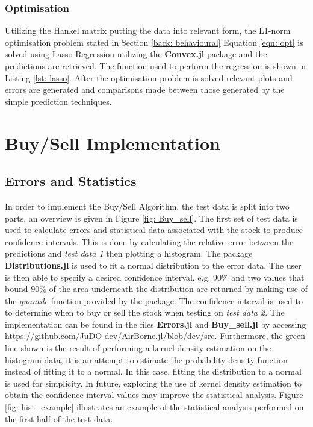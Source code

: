 \subsubsection{Optimisation}

Utilizing the Hankel matrix putting the data into relevant form, the L1-norm optimisation problem stated in Section \ref{back: behavioural} Equation \ref{eqn: opt} is solved using Lasso Regression utilizing the \textbf{Convex.jl} package and the predictions are retrieved. The function used to perform the regression is shown in Listing \ref{lst: lasso}. After the optimisation problem is solved relevant plots and errors are generated and comparisons made between those generated by the simple prediction techniques. 

\section{Buy/Sell Implementation}
\label{section: buy_sell}

\subsection{Errors and Statistics}

In order to implement the Buy/Sell Algorithm, the test data is split into two parts, an overview is given in Figure \ref{fig: Buy_sell}. The first set of test data is used to calculate errors and statistical data associated with the stock to produce confidence intervals. This is done by calculating the relative error between the predictions and \textit{test data 1} then plotting a histogram. The package \textbf{Distributions.jl} is used to fit a normal distribution to the error data. The user is then able to specify a desired confidence interval, e.g. $90\%$ and two values that bound $90\%$ of the area underneath the distribution are returned by making use of the \textit{quantile} function provided by the package. The confidence interval is used to to determine when to buy or sell the stock when testing on \textit{test data 2}. The implementation can be found in the files \textbf{Errors.jl} and \textbf{Buy\_sell.jl} by accessing \hyperlink{label}{https://github.com/JuDO-dev/AirBorne.jl/blob/dev/src}. Furthermore, the green line shown is the result of performing a kernel density estimation on the histogram data, it is an attempt to estimate the probability density function instead of fitting it to a normal. In this case, fitting the distribution to a normal is used for simplicity. In future, exploring the use of kernel density estimation to obtain the confidence interval values may improve the statistical analysis.
Figure \ref{fig: hist_example} illustrates an example of the statistical analysis performed on the first half of the test data.

